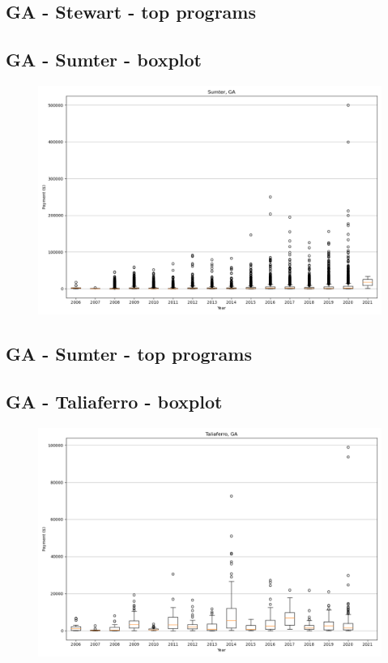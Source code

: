 \subsection*{GA - Stewart - top programs}

\newpage
\subsection*{GA - Sumter - boxplot}
\begin{figure}[h]
\centering
\includegraphics[width=7in]{../output/boxplots/counties/Sumter-GA_boxplot.png}
\end{figure}


\subsection*{GA - Sumter - top programs}

\newpage
\subsection*{GA - Taliaferro - boxplot}
\begin{figure}[h]
\centering
\includegraphics[width=7in]{../output/boxplots/counties/Taliaferro-GA_boxplot.png}
\end{figure}


